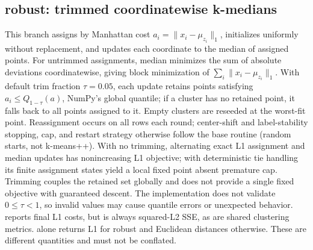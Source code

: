 \documentclass[conference]{IEEEtran}
\begin{document}
\subsection{robust: trimmed coordinatewise k-medians}
This branch assigns by Manhattan cost \(a_i=\|x_i-\mu_{z_i}\|_1\), initializes uniformly without replacement, and updates each coordinate to the median of assigned points. For untrimmed assignments, median minimizes the sum of absolute deviations coordinatewise, giving block minimization of \(\sum_i\|x_i-\mu_{z_i}\|_1\). With default trim fraction \(\tau=0.05\), each update retains points satisfying \(a_i\leq Q_{1-\tau}(a)\), NumPy's global quantile; if a cluster has no retained point, it falls back to all points assigned to it. Empty clusters are reseeded at the worst-fit point. Reassignment occurs on all rows each round; center-shift and label-stability stopping, cap, and restart strategy otherwise follow the base routine (random starts, not k-means++).
With no trimming, alternating exact L1 assignment and median updates has nonincreasing L1 objective; with deterministic tie handling its finite assignment states yield a local fixed point absent premature cap. Trimming couples the retained set globally and does not provide a single fixed objective with guaranteed descent. The implementation does not validate \(0\leq\tau<1\), so invalid values may cause quantile errors or unexpected behavior.  reports final L1 costs, but  is always squared-L2 SSE, as are shared clustering metrics.  alone returns L1 for robust and Euclidean distances otherwise. These are different quantities and must not be conflated.
\end{document}
